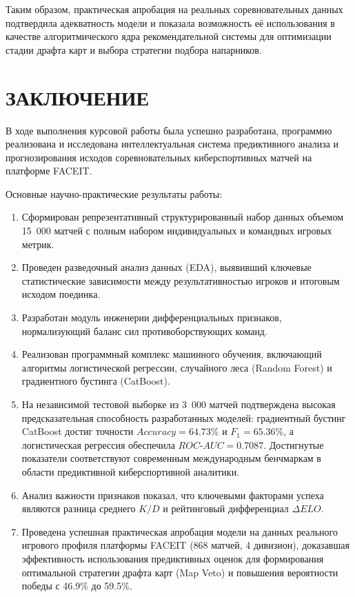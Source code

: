 \documentclass[14pt, a4paper]{extarticle}
\begin{document}
Таким образом, практическая апробация на реальных соревновательных данных подтвердила адекватность модели и показала возможность её использования в качестве алгоритмического ядра рекомендательной системы для оптимизации стадии драфта карт и выбора стратегии подбора напарников.

\newpage

\section*{ЗАКЛЮЧЕНИЕ}

В ходе выполнения курсовой работы была успешно разработана, программно реализована и исследована интеллектуальная система предиктивного анализа и прогнозирования исходов соревновательных киберспортивных матчей на платформе FACEIT.

Основные научно-практические результаты работы:
\begin{enumerate}
    \item Сформирован репрезентативный структурированный набор данных объемом 15~000 матчей с полным набором индивидуальных и командных игровых метрик.
    \item Проведен разведочный анализ данных (EDA), выявивший ключевые статистические зависимости между результативностью игроков и итоговым исходом поединка.
    \item Разработан модуль инженерии дифференциальных признаков, нормализующий баланс сил противоборствующих команд.
    \item Реализован программный комплекс машинного обучения, включающий алгоритмы логистической регрессии, случайного леса (Random Forest) и градиентного бустинга (CatBoost).
    \item На независимой тестовой выборке из 3~000 матчей подтверждена высокая предсказательная способность разработанных моделей: градиентный бустинг CatBoost достиг точности $Accuracy = 64.73\%$ и $F_1 = 65.36\%$, а логистическая регрессия обеспечила $ROC\text{-}AUC = 0.7087$. Достигнутые показатели соответствуют современным международным бенчмаркам в области предиктивной киберспортивной аналитики.
    \item Анализ важности признаков показал, что ключевыми факторами успеха являются разница среднего $K/D$ и рейтинговый дифференциал $\Delta ELO$.
    \item Проведена успешная практическая апробация модели на данных реального игрового профиля платформы FACEIT (868 матчей, 4 дивизион), доказавшая эффективность использования предиктивных оценок для формирования оптимальной стратегии драфта карт (Map Veto) и повышения вероятности победы с 46.9\% до 59.5\%.
\end{enumerate}
\end{document}
